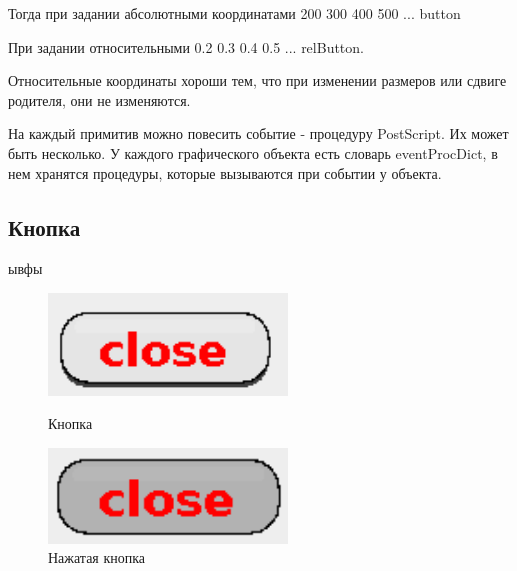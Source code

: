 \documentclass[14pt]{extarticle}
\begin{document}
		Тогда при задании абсолютными координатами 		
		200 300 400 500 ... button
		
При задании относительными
		0.2 0.3 0.4 0.5	... relButton.
		
		
Относительные координаты хороши тем, что при изменении размеров или сдвиге родителя, они не изменяются.

На каждый примитив можно повесить событие - процедуру PostScript. Их может быть несколько. У каждого графического объекта есть словарь eventProcDict, в нем хранятся процедуры, которые вызываются при событии у объекта. 
	
	\subsection{Кнопка}
	ывфы
		\begin{figure}[h]
		\begin{center}
		\begin{minipage}[h]{0.4\linewidth}
		\includegraphics[width=180pt]{pictures/close1.png}
		\caption{ Кнопка} %
		\label{ris:b1} %
		\end{minipage}
		\hfill 
		\begin{minipage}[h]{0.4\linewidth}
		\includegraphics[width=180pt]{pictures/close2.png}
		\caption{Нажатая кнопка}
		\label{ris:b2}
		\end{minipage}
		\end{center}
		\end{figure}	
		
\end{document}
